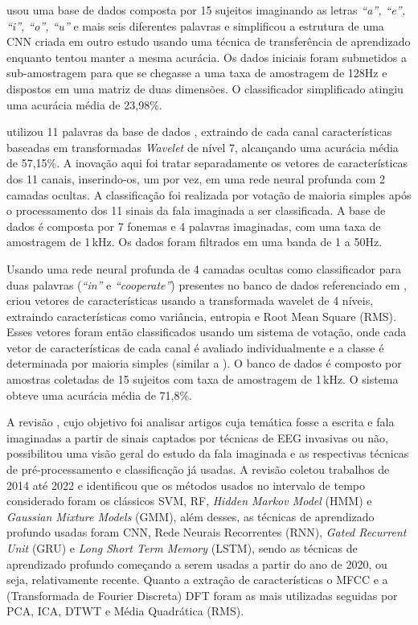 			\par {} usou uma base de dados composta por 15 sujeitos imaginando as letras \textit{``a'', ``e'', ``i'', ``o'', ``u''} e mais seis diferentes palavras \cite{10.1117/12.2255697} e simplificou a estrutura de uma CNN criada em outro estudo usando uma técnica de transferência de aprendizado enquanto tentou manter a mesma acurácia. Os dados iniciais foram submetidos a sub-amostragem para que se chegasse a uma taxa de amostragem de 128Hz e dispostos em uma matriz de duas dimensões. O classificador simplificado atingiu uma acurácia média de 23,98\%.
			
			\par {} utilizou 11 palavras da base de dados \cite{7178118}, extraindo de cada canal características baseadas em transformadas \textit{Wavelet} de nível 7, alcançando uma acurácia média de 57,15\%. A inovação aqui foi tratar separadamente os vetores de características dos 11 canais, inserindo-os, um por vez, em uma rede neural profunda com 2 camadas ocultas. A classificação foi realizada por votação de maioria simples após o processamento dos 11 sinais da fala imaginada a ser classificada. A base de dados é composta por 7 fonemas e 4 palavras imaginadas, com uma taxa de amostragem de 1\,kHz. Os dados foram filtrados em uma banda de 1 a 50Hz.
			
			\par Usando uma rede neural profunda de 4 camadas ocultas como classificador para duas palavras (\textit{``in''} e \textit{``cooperate''}) presentes no banco de dados referenciado em ,  criou vetores de características usando a transformada wavelet de 4 níveis, extraindo características como variância, entropia e Root Mean Square (RMS). Esses vetores foram então classificados usando um sistema de votação, onde cada vetor de características de cada canal é avaliado individualmente e a classe é determinada por maioria simples (similar a \cite{Panachakel_2019}). O banco de dados é composto por amostras coletadas de 15 sujeitos com taxa de amostragem de 1\,kHz. O sistema obteve uma acurácia média de 71,8\%.
			
			\par A revisão \cite{s23125575}, cujo objetivo foi analisar artigos cuja temática fosse a escrita e fala imaginadas a partir de sinais captados por técnicas de EEG invasivas ou não, possibilitou uma visão geral do estudo da fala imaginada e as respectivas técnicas de pré-processamento e classificação já usadas. A revisão coletou trabalhos de 2014 até 2022 e identificou que os métodos usados no intervalo de tempo considerado foram os clássicos SVM, RF, \textit{Hidden Markov Model} (HMM) e \textit{Gaussian Mixture Models} (GMM), além desses, as técnicas de aprendizado profundo usadas foram CNN, Rede Neurais Recorrentes (RNN), \textit{Gated Recurrent Unit} (GRU) e \textit{Long Short Term Memory} (LSTM), sendo as técnicas de aprendizado profundo começando a serem usadas a partir do ano de 2020, ou seja, relativamente recente. Quanto a extração de características o MFCC e a (Transformada de Fourier Discreta) DFT foram as mais utilizadas seguidas por PCA, ICA, DTWT e Média Quadrática (RMS).
			
